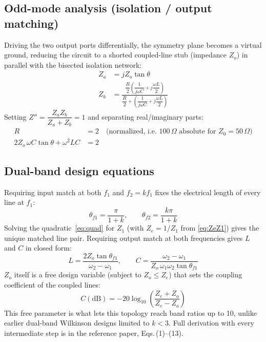 \documentclass[11pt]{article}
\begin{document}
\subsection{Odd-mode analysis (isolation / output matching)}
Driving the two output ports differentially, the symmetry plane becomes a virtual
ground, reducing the circuit to a shorted coupled-line stub (impedance $Z_o$) in
parallel with the bisected isolation network:
\begin{align}
Z_a &= jZ_o\tan\theta \\
Z_b &= \frac{\dfrac{R}{2}\left(\dfrac{1}{j\omega C}+j\dfrac{\omega L}{2}\right)}{\dfrac{R}{2}+\left(\dfrac{1}{j\omega C}+j\dfrac{\omega L}{2}\right)}
\end{align}
Setting $Z'' = \dfrac{Z_a Z_b}{Z_a+Z_b} = 1$ and separating real/imaginary parts:
\begin{align}
R &= 2 \quad\text{(normalized, i.e. } 100\,\Omega \text{ absolute for } Z_0=50\,\Omega)\\
2Z_o\,\omega C\tan\theta + \omega^2 LC &= 2
\end{align}

\subsection{Dual-band design equations}
Requiring input match at both $f_1$ and $f_2=kf_1$ fixes the electrical length of
every line at $f_1$:
\begin{equation}
\theta_{f1} = \frac{\pi}{1+k}, \qquad \theta_{f2} = \frac{k\pi}{1+k}
\end{equation}
Solving the quadratic~\eqref{eq:quad} for $Z_1$ (with $Z_e=1/Z_1$ from
\eqref{eq:ZeZ1}) gives the unique matched line pair. Requiring output match at both
frequencies gives $L$ and $C$ in closed form:
\begin{equation}
L = \frac{2Z_o\tan\theta_{f1}}{\omega_2-\omega_1}, \qquad
C = \frac{\omega_2-\omega_1}{Z_o\,\omega_1\omega_2\tan\theta_{f1}}
\end{equation}
$Z_o$ itself is a free design variable (subject to $Z_o \le Z_e$) that sets the
coupling coefficient of the coupled lines:
\begin{equation}
C(\mathrm{dB}) = -20\log_{10}\!\left(\frac{Z_e+Z_o}{Z_e-Z_o}\right)
\end{equation}
This free parameter is what lets this topology reach band ratios up to 10, unlike
earlier dual-band Wilkinson designs limited to $k<3$. Full derivation with every
intermediate step is in the reference paper, Eqs.\,(1)--(13).
\end{document}
